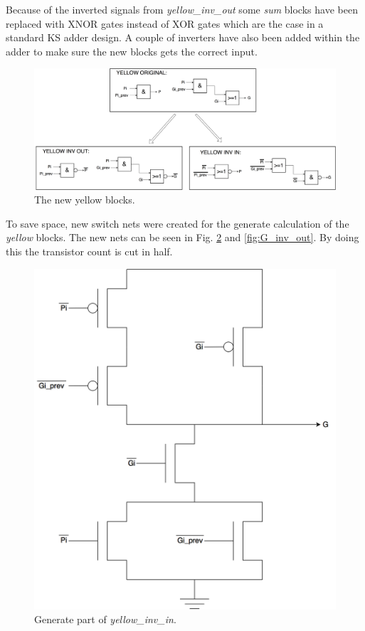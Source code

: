 Because of the inverted signals from \textit{yellow\_inv\_out} some \textit{sum} blocks have been replaced with XNOR gates instead of XOR gates which are the case in a standard KS adder design. A couple of inverters have also been added within the adder to make sure the new blocks gets the correct input.

\begin{figure}[H]
  \centering
  \captionsetup{justification=centering}
  \includegraphics[scale=0.12]{../figures/yellow_opt}
  \caption{The new yellow blocks.} \label{fig:yellow_opt}
\end{figure}

To save space, new switch nets were created for the generate calculation of the \textit{yellow} blocks. The new nets can be seen in Fig. \ref{fig:G_inv_in} and \ref{fig:G_inv_out}. By doing this the transistor count is cut in half. 

\begin{figure}[H]
  \centering
  \captionsetup{justification=centering}
  \includegraphics[scale=0.15]{../figures/G_inv_in}
  \caption{Generate part of \textit{yellow\_inv\_in}.} \label{fig:G_inv_in}
\end{figure}

